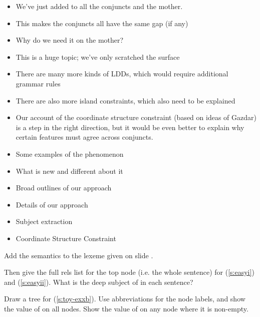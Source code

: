 \documentclass[a4paper,landscape,headrule,footrule]{foils}
\begin{document}
\begin{itemize}
\item We've just added  to all the conjuncts and the mother.
\item This makes the conjuncts all have the same gap (if any)
\item Why do we need it on the mother?
\end{itemize}


\begin{itemize}
\item This is a huge topic; we've only scratched the
surface
\item There are many more kinds of LDDs, which
would require additional grammar rules
\item There are also more island constraints, which also
need to be explained
\item Our account of the coordinate structure constraint
(based on ideas of Gazdar) is a step in the right
direction, but it would be even better to explain why certain
features must agree across conjuncts.
\end{itemize}


\begin{itemize}
\item Some examples of the phenomenon
\item What is new and different about it
\item Broad outlines of our approach
\item Details of our approach
\item Subject extraction
\item Coordinate Structure Constraint
\end{itemize}


Add the semantics to the lexeme  given on slide \pageref{l:easy}.

Then give the full rels list for the top node (i.e. the whole
sentence) for (\ref{s:easyi}) and (\ref{s:easyii}).  What is the deep
subject of  in each sentence?  

 \begin{exe}
    \ex \label{s:easyi}
    \ex \label{s:easyii}
  \end{exe}

Draw a tree for (\ref{s:toy-exxb}).  
Use abbreviations for the node labels, and show the value of 
on all nodes.  Show the value of  on any node where it is
non-empty.
\end{document}
